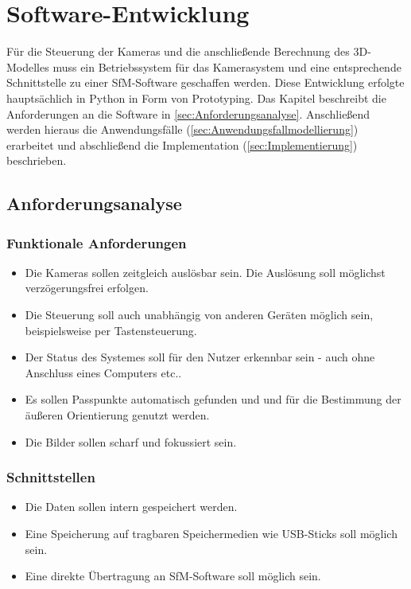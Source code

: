 \documentclass[./00PhotoBox.tex]{subfiles}
\begin{document}
\chapter{Software-Entwicklung}
Für die Steuerung der Kameras und die anschließende Berechnung des 3D-Modelles muss ein Betriebssystem für das Kamerasystem und eine entsprechende Schnittstelle zu einer \gls{SfM}-Software geschaffen werden. Diese Entwicklung erfolgte hauptsächlich in Python in Form von Prototyping. Das Kapitel beschreibt die Anforderungen an die Software in \autoref{sec:Anforderungsanalyse}. Anschließend werden hieraus die Anwendungsfälle (\autoref{sec:Anwendungsfallmodellierung}) erarbeitet und abschließend die Implementation (\autoref{sec:Implementierung}) beschrieben.

\section{Anforderungsanalyse}
\label{sec:Anforderungsanalyse}

\subsection{Funktionale Anforderungen}
\begin{itemize}
    \item Die Kameras sollen zeitgleich auslösbar sein. Die Auslösung soll möglichst ver\-zögerungs\-frei erfolgen.
    \item Die Steuerung soll auch unabhängig von anderen Geräten möglich sein, beispielsweise per Tastensteuerung.
    \item Der Status des Systemes soll für den Nutzer erkennbar sein - auch ohne Anschluss eines Computers etc..
    \item Es sollen Passpunkte automatisch gefunden und und für die Bestimmung der äußeren Orientierung genutzt werden.
    \item Die Bilder sollen scharf und fokussiert sein.
\end{itemize}

\subsection{Schnittstellen}
\begin{itemize}
    \item Die Daten sollen intern gespeichert werden.
    \item Eine Speicherung auf tragbaren Speichermedien wie USB-Sticks soll möglich sein.
    \item Eine direkte Übertragung an \gls{SfM}-Software soll möglich sein.
\end{itemize}
\end{document}
